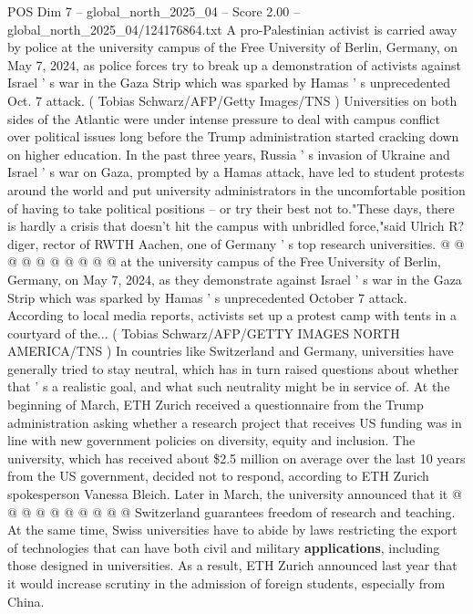 \begin{textsample}{POS Dim 7 – global\_north\_2025\_04 – Score 2.00 – global\_north\_2025\_04/124176864.txt}  \label{ex:f7_pos_354}
A pro-Palestinian activist is carried away by police at the university campus of the Free University of Berlin, Germany, on May 7, 2024, as police forces try to break up a demonstration of activists against Israel ' s war in the Gaza Strip which was sparked by Hamas ' s unprecedented Oct. 7 attack. ( Tobias Schwarz/AFP/Getty Images/TNS ) Universities on both sides of the Atlantic were under intense pressure to deal with campus conflict over political issues long before the Trump administration started cracking down on higher education.
In the past three years, Russia ' s invasion of Ukraine and Israel ' s war on Gaza, prompted by a Hamas attack, have led to student protests around the world and put university administrators in the uncomfortable position of having to take political positions -- or try their best not to."These days, there is hardly a crisis that doesn't hit the campus with unbridled force,"said Ulrich R? diger, rector of RWTH Aachen, one of Germany ' s top research universities. @ @ @ @ @ @ @ @ @ @ at the university campus of the Free University of Berlin, Germany, on May 7, 2024, as they demonstrate against Israel ' s war in the Gaza Strip which was sparked by Hamas ' s unprecedented October 7 attack.
According to local media reports, activists set up a protest camp with tents in a courtyard of the... ( Tobias Schwarz/AFP/GETTY IMAGES NORTH AMERICA/TNS ) In countries like Switzerland and Germany, universities have generally tried to stay neutral, which has in turn raised questions about whether that ' s a realistic goal, and what such neutrality might be in service of.
At the beginning of March, ETH Zurich received a questionnaire from the Trump administration asking whether a research project that receives US funding was in line with new government policies on diversity, equity and inclusion.
The university, which has received about \$2.5 million on average over the last 10 years from the US government, decided not to respond, according to ETH Zurich spokesperson Vanessa Bleich.
Later in March, the university announced that it @ @ @ @ @ @ @ @ @ @ Switzerland guarantees freedom of research and teaching.
At the same time, Swiss universities have to abide by laws restricting the export of technologies that can have both civil and military \textbf{applications}, including those designed in universities.
As a result, ETH Zurich announced last year that it would increase scrutiny in the admission of foreign students, especially from China.

\end{textsample}

